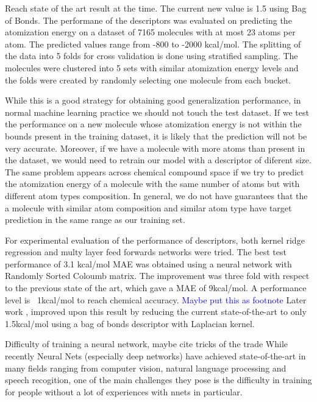 \documentclass[10pt,journal,a4paper]{IEEEtran}
\begin{document}
Reach state of the art result at the time. The current new value is 1.5 using Bag of Bonds.
The performane of the descriptors was evaluated on predicting the atomization energy on a dataset of 7165 molecules with at most 23 atoms per atom. The predicted values range from -800 to -2000 kcal/mol. The splitting of the data into 5 folds for cross validation is done using stratified sampling. The molecules were clustered into 5 sets with similar atomization energy levels and the folds were created by randomly selecting one molecule from each bucket.

While this is a good strategy for obtaining good generalization performance, in normal machine learning practice we should not touch the test dataset. If we test the performance on a new molecule whose atomization energy is not within the bounds present in the training dataset, it is likely that the prediction will not be very accurate. Moreover, if we have a molecule with more atoms than present in the dataset, we would need to retrain our model with a  descriptor of diferent size. The same problem appears across chemical compound space if we try to predict the atomization energy of a molecule with the same number of atoms but with different atom types composition. In general, we do not have guarantees that the a molecule with similar atom composition and similar atom type have target prediction in the same range as our training set.

For experimental evaluation of the performance of descriptors, both kernel ridge regression and multy layer feed forwards networks were tried. The best test performance of 3.1 kcal/mol MAE was obtained using a neural network with
 Randomly Sorted Coloumb matrix. The improvement was three fold with respect to the previous state of the art, which gave a MAE of 9kcal/mol. A performance level is ~1kcal/mol to reach chemical accuracy.
 \textcolor{blue}{Maybe put this as footnote}
Later work \cite{bob}, improved upon this result by reducing the current state-of-the-art to only 1.5kcal/mol using a bag of bonds descriptor with Laplacian kernel.

Difficulty of training a neural network, maybe cite tricks of the trade
While recently Neural Nets (especially deep networks) have achieved state-of-the-art in many fields ranging from computer vision, natural language processing and speech recogition, one of the main challenges they pose is the difficulty in training for people without a lot of experiences with nnets in particular. 
\end{document}
